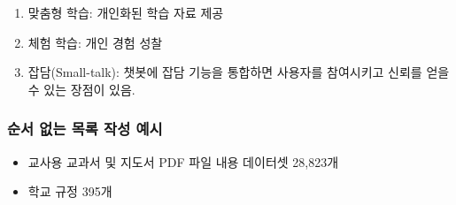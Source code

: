 \begin{enumerate}
    \item 맞춤형 학습: 개인화된 학습 자료 제공
    \item 체험 학습: 개인 경험 성찰
    \item 잡담(Small-talk): 챗봇에 잡담 기능을 통합하면 사용자를 참여시키고 신뢰를 얻을 수 있는 장점이 있음.
\end{enumerate}

\subsubsection{순서 없는 목록 작성 예시}

\begin{itemize}
    \item 교사용 교과서 및 지도서 PDF 파일 내용 데이터셋 28,823개
    \item 학교 규정 395개
\end{itemize}